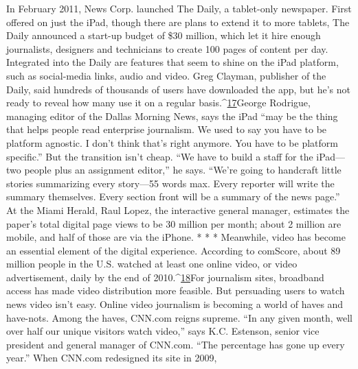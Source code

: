 In February 2011, News Corp. launched The Daily, a tablet-only newspaper.
First offered on just the iPad, though there are plans to extend it to more tablets,
The Daily announced a start-up budget of \$30 million, which let it hire enough
journalists, designers and technicians to create 100 pages of content per day. Integrated
into the Daily are features that seem to shine on the iPad platform, such
as social-media links, audio and video. Greg Clayman, publisher of the Daily, said
hundreds of thousands of users have downloaded the app, but he’s not ready to
reveal how many use it on a regular basis.^{\href{#endnotes-ch4}{17}}George Rodrigue, managing editor of the Dallas Morning News, says the iPad
``may be the thing that helps people read enterprise journalism. We used to say
you have to be platform agnostic. I don’t think that’s right anymore. You have
to be platform specific.'' But the transition isn’t cheap. ``We have to build a staff
for the iPad—two people plus an assignment editor,'' he says. ``We’re going to
handcraft little stories summarizing every story—55 words max. Every reporter
will write the summary themselves. Every section front will be a summary of the
news page.'' At the Miami Herald, Raul Lopez, the interactive general manager,
estimates the paper’s total digital page views to be 30 million per month; about 2
million are mobile, and half of those are via the iPhone.
* * *
Meanwhile, video has become an essential element of the digital experience.
According to comScore, about 89 million people in the U.S. watched at least one
online video, or video advertisement, daily by the end of 2010.^{\href{#endnotes-ch4}{18}}For journalism sites, broadband access has made video distribution more feasible.
But persuading users to watch news video isn’t easy. Online video journalism
is becoming a world of haves and have-nots. Among the haves, CNN.com
reigns supreme.
``In any given month, well over half our unique visitors watch video,'' says
K.C. Estenson, senior vice president and general manager of CNN.com. ``The
percentage has gone up every year.'' When CNN.com redesigned its site in 2009,

